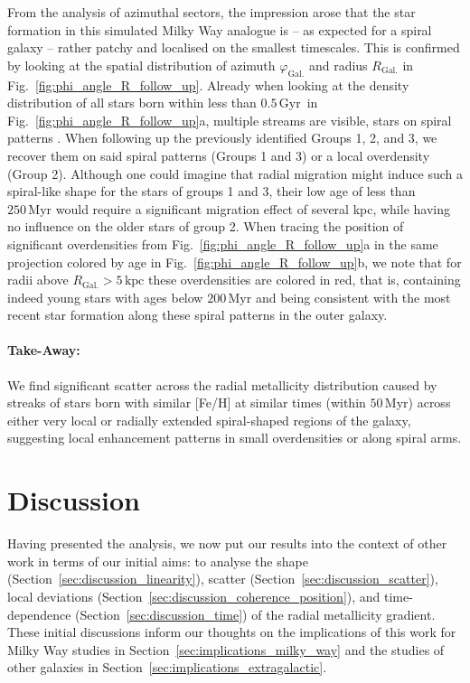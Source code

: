 \documentclass[fleqn,usenatbib]{mnras}
\newcommand{\nihaoAGEmax}{$0.5\,\mathrm{Gyr}$}
\begin{document}
From the analysis of azimuthal sectors, the impression arose that the star formation in this simulated Milky Way analogue is -- as expected for a spiral galaxy -- rather patchy and localised on the smallest timescales. This is confirmed by looking at the spatial distribution of azimuth $\varphi_\mathrm{Gal.}$ and radius $R_\mathrm{Gal.}$ in Fig.~\ref{fig:phi_angle_R_follow_up}. Already when looking at the density distribution of all stars born within less than \nihaoAGEmax\ in Fig.~\ref{fig:phi_angle_R_follow_up}a, multiple streams are visible, stars on spiral patterns \citep[see also][]{Chen2024b, Kreckel2019}. When following up the previously identified Groups 1, 2, and 3, we recover them on said spiral patterns (Groups 1 and 3) or a local overdensity (Group 2). Although one could imagine that radial migration might induce such a spiral-like shape for the stars of groups 1 and 3, their low age of less than $250\,\mathrm{Myr}$ would require a significant migration effect of several kpc, while having no influence on the older stars of group 2. When tracing the position of significant overdensities from Fig.~\ref{fig:phi_angle_R_follow_up}a in the same projection colored by age in Fig.~\ref{fig:phi_angle_R_follow_up}b, we note that for radii above $R_\mathrm{Gal.} > 5\,\mathrm{kpc}$ these overdensities are colored in red, that is, containing indeed young stars with ages below $200\,\mathrm{Myr}$ and being consistent with the most recent star formation along these spiral patterns in the outer galaxy.

\paragraph*{Take-Away:} We find significant scatter across the radial metallicity distribution caused by streaks of stars born with similar [Fe/H] at similar times (within $50\,\mathrm{Myr}$) across either very local or radially extended spiral-shaped regions of the galaxy, suggesting local enhancement patterns in small overdensities or along spiral arms.

\section{Discussion} \label{sec:discussion}

Having presented the analysis, we now put our results into the context of other work in terms of our initial aims: to analyse the shape (Section~\ref{sec:discussion_linearity}), scatter (Section~\ref{sec:discussion_scatter}), local deviations (Section~\ref{sec:discussion_coherence_position}), and time-dependence (Section~\ref{sec:discussion_time}) of the radial metallicity gradient. These initial discussions inform our thoughts on the implications of this work for Milky Way studies in Section~\ref{sec:implications_milky_way} and the studies of other galaxies in Section~\ref{sec:implications_extragalactic}.
\end{document}
